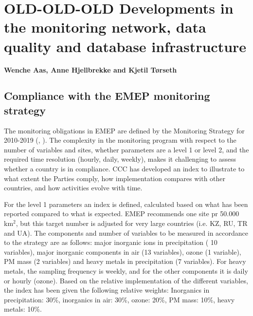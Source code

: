 \chapter[Development of measurements]{OLD-OLD-OLD Developments in the monitoring network, data quality and database
infrastructure}
\label{ch:ObsDevel}

{\bf{Wenche Aas, Anne Hjellbrekke and Kjetil T{\o}rseth}}\\

\vspace{30pt}
	    
\section{\label{sec:Compliance-with-monitoring}Compliance with the EMEP monitoring strategy}

The monitoring obligations in EMEP are defined by the Monitoring Strategy for 2010-2019 
(\cite{MonStrat2009}, \cite{Torseth2012}). The complexity in the monitoring program with respect 
to the number of variables and sites, whether parameters are a level 1 or level 2, and the required 
time resolution (hourly, daily, weekly), makes it challenging to assess whether a country is in 
compliance. CCC has developed an index to illustrate to what extent the Parties comply, how 
implementation compares with other countries, and how activities evolve with time.

For the level 1 parameters an index is defined, calculated based on what has been reported compared 
to what is expected. EMEP recommends one site pr 50.000 km$^{2}$, but this target number is adjusted 
for very large countries (i.e. KZ, RU, TR and UA). The components and number of variables to be 
measured in accordance to the strategy are as follows: major inorganic ions in precipitation (
10 variables), major inorganic components in air (13 variables), ozone (1 variable), PM mass (2 variables) 
and heavy metals in precipitation (7 variables). For heavy metals, the sampling frequency is weekly, 
and for the other components it is daily or hourly (ozone). Based on the relative implementation of 
the different variables, the index has been given the following relative weights: Inorganics in 
precipitation: 30\%, inorganics in air: 30\%, ozone: 20\%, PM mass: 10\%, heavy metals: 10\%.

